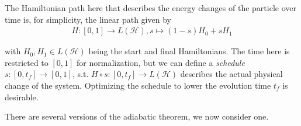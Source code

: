 \documentclass[10pt]{amsart}
\theoremstyle{definition}
\theoremstyle{remark}
\begin{document}
    \phantom{}
    
    The Hamiltonian path here that describes the energy changes of the particle over time is, for simplicity, the linear path given by
    \begin{align}
        H\colon [0, 1] \to L(\mathcal{H}), s \mapsto (1-s)H_0 + sH_1
    \end{align}

    \phantom{}

    \begin{minipage}{\linewidth}
        \centering
    \end{minipage}

    \phantom{}

    with \(H_0, H_1 \in L(\mathcal{H})\) being the start and final Hamiltonians. The time here is restricted to \([0, 1]\) for normalization, but we can define a \emph{schedule} \(s\colon [0, t_f] \to [0, 1]\), s.t. \(H \circ s\colon [0, t_f] \to L(\mathcal{H})\) describes the actual physical change of the system. Optimizing the schedule to lower the evolution time \(t_f\) is desirable.

    \phantom{}
    
    There are several versions of the adiabatic theorem, we now consider one.
\end{document}
